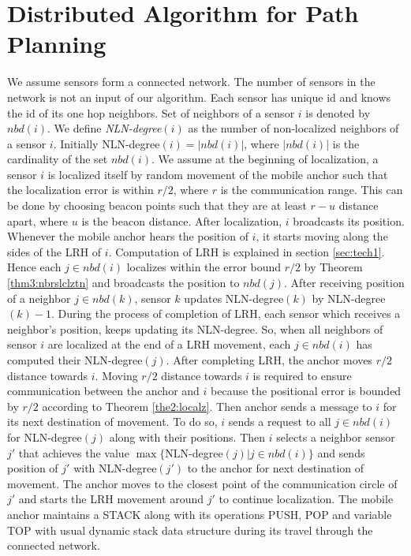 \documentclass[preprint,11pt]{elsarticle}
\begin{document}
\section{Distributed Algorithm for Path Planning}
\label{sec:algomodel}
We assume sensors form a connected network. The number of sensors in the network is not an input of our algorithm.
Each sensor has unique id and knows the id of its one hop neighbors. Set of neighbors of a sensor $i$ is denoted by $nbd(i)$.
We define {\it NLN-degree}$(i)$ as the number of non-localized neighbors of a sensor $i$. Initially NLN-degree$(i)=|nbd(i)|$, where
$|nbd(i)|$ is the cardinality of the set $nbd(i)$. We assume at the beginning of localization, a sensor $i$ is localized itself by
random movement of the mobile anchor such that the localization error is within $r/2$, where $r$ is the communication range. This can be done by choosing beacon points such that they are at least $r-u$ distance apart, where $u$ is the beacon distance. After localization, $i$
broadcasts its position.
Whenever the mobile anchor hears the position of $i$, it starts moving along the sides of the LRH of $i$. Computation of LRH is explained in section \ref{sec:tech1}. Hence each $j\in nbd(i)$ localizes within the error bound $r/2$ by Theorem \ref{thm3:nbrslclztn} and broadcasts the position to $nbd(j)$. After receiving position of a neighbor $j\in nbd(k)$, sensor $k$ updates NLN-degree$(k)$ by NLN-degree$(k)-1$. During the process of completion of LRH, each sensor which receives a neighbor's position, keeps updating its NLN-degree. So, when all neighbors of sensor $i$ are localized at the end of a LRH movement, each $j\in nbd(i)$ has computed their NLN-degree$(j)$. After completing LRH, the anchor moves $r/2$ distance towards $i$. Moving $r/2$ distance towards $i$ is required to ensure communication between the anchor and $i$ because the positional error is bounded by $r/2$ according to Theorem \ref{the2:localz}. Then anchor sends a message to $i$ for its next destination of movement.
To do so, $i$ sends a request to all $j\in nbd(i)$ for NLN-degree$(j)$ along with their positions. Then $i$ selects
a neighbor sensor $j'$ that achieves the value $\max\{$NLN-degree$(j) | j\in nbd(i)\}$ and sends position of $j'$ with NLN-degree$(j')$ to the anchor for next destination of movement. The anchor moves to the closest point of the communication circle of $j'$ and starts the LRH movement around $j'$ to continue localization. The mobile anchor maintains a STACK along with its operations PUSH, POP and variable TOP with usual dynamic stack data structure during its travel through the connected network.
\end{document}
